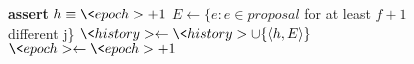 \begin{figure}[t!]
\begin{adjustbox}{minipage=[t]{\columnwidth}}
\begin{algorithm}[H]
\begin{algorithmic}[1]
              \State \textbf{assert} $h \equiv \<epoch> + 1$
              \State $E \leftarrow \{e:e \in \textit{proposal}$ %
              for at least $f+1$ different j\}%
              \State $\<history> \leftarrow \<history> \cup \{\langle h, E \rangle\}$\label{alg1:added}
              \State $\<epoch> \leftarrow \<epoch> + 1$
            \EndUpon
          \end{algorithmic}
        \end{algorithm}
        \end{adjustbox}
  \end{figure}
